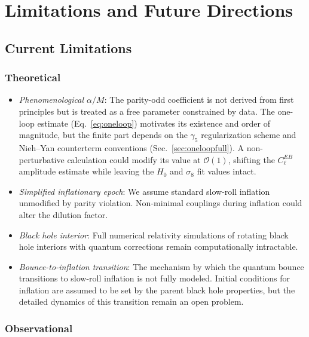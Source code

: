 \documentclass[aps,prd,twocolumn,superscriptaddress,showpacs,preprintnumbers,nofootinbib,longbibliography,floatfix]{revtex4-2}
\begin{document}
\section{Limitations and Future Directions}\label{sec:limitations}\label{sec:futuredirections}

\subsection{Current Limitations}

\subsubsection{Theoretical}

\begin{itemize}[leftmargin=*]
\item \textit{Phenomenological $\alpha/M$}: The parity-odd coefficient is not derived from first principles but is treated as a free parameter constrained by data. The one-loop estimate (Eq.~\ref{eq:oneloop}) motivates its existence and order of magnitude, but the finite part depends on the $\gamma_5$ regularization scheme and Nieh--Yan counterterm conventions (Sec.~\ref{sec:oneloopfull}). A non-perturbative calculation could modify its value at $\mathcal{O}(1)$, shifting the $C_\ell^{EB}$ amplitude estimate while leaving the $H_0$ and $\sigma_8$ fit values intact.

\item \textit{Simplified inflationary epoch}: We assume standard slow-roll inflation unmodified by parity violation. Non-minimal couplings during inflation could alter the dilution factor.

\item \textit{Black hole interior}: Full numerical relativity simulations of rotating black hole interiors with quantum corrections remain computationally intractable.

\item \textit{Bounce-to-inflation transition}: The mechanism by which the quantum bounce transitions to slow-roll inflation is not fully modeled. Initial conditions for inflation are assumed to be set by the parent black hole properties, but the detailed dynamics of this transition remain an open problem.
\end{itemize}

\subsubsection{Observational}
\end{document}
